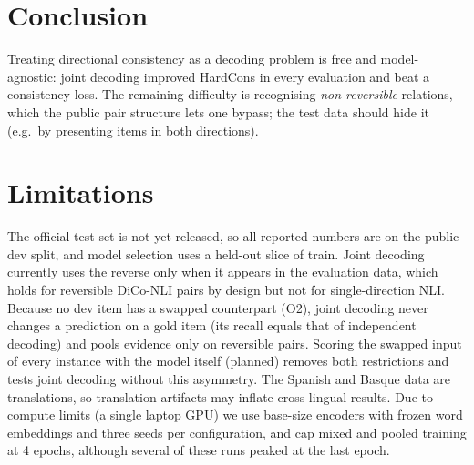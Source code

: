 \section{Conclusion}

Treating directional consistency as a decoding problem is free and model-agnostic: joint decoding improved HardCons in every evaluation and beat a consistency loss. The remaining difficulty is recognising \emph{non-reversible} relations, which the public pair structure lets one bypass; the test data should hide it (e.g.\ by presenting \NO items in both directions).

\section*{Limitations}
The official test set is not yet released, so all reported numbers are on the public dev split, and model selection uses a held-out slice of train. Joint decoding currently uses the reverse only when it appears in the evaluation data, which holds for reversible DiCo-NLI pairs by design but not for single-direction NLI. Because no dev \NO item has a swapped counterpart (O2), joint decoding never changes a prediction on a gold \NO item (its \NO recall equals that of independent decoding) and pools evidence only on reversible pairs. Scoring the swapped input of every instance with the model itself (planned) removes both restrictions and tests joint decoding without this asymmetry. The Spanish and Basque data are translations, so translation artifacts may inflate cross-lingual results. Due to compute limits (a single laptop GPU) we use base-size encoders with frozen word embeddings and three seeds per configuration, and cap mixed and pooled training at 4 epochs, although several of these runs peaked at the last epoch.
